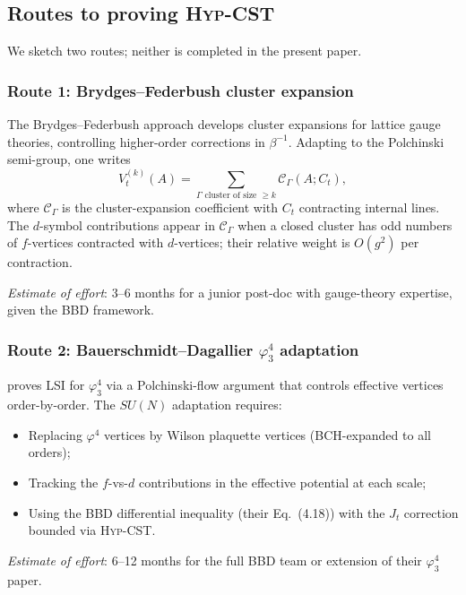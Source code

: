 \documentclass[11pt,a4paper]{amsart}
\theoremstyle{definition}
\begin{document}
\subsection{Routes to proving \textsc{Hyp-CST}}\label{ssec:CST-routes}

We sketch two routes; neither is completed in the present paper.

\subsubsection{Route 1: Brydges--Federbush cluster expansion}

The Brydges--Federbush approach \cite{BrydgesFederbush1981, Brydges2009}
develops cluster expansions for lattice gauge theories, controlling
higher-order corrections in $\beta^{-1}$. Adapting to the Polchinski
semi-group, one writes
\[
V_t^{(k)}(A) = \sum_{\Gamma \text{ cluster of size } \geq k} \mathcal C_\Gamma(A; C_t),
\]
where $\mathcal C_\Gamma$ is the cluster-expansion coefficient with $C_t$
contracting internal lines. The $d$-symbol contributions appear in
$\mathcal C_\Gamma$ when a closed cluster has odd numbers of $f$-vertices
contracted with $d$-vertices; their relative weight is $O(g^2)$ per
contraction.

\emph{Estimate of effort}: 3--6 months for a junior post-doc with
gauge-theory expertise, given the BBD framework.

\subsubsection{Route 2: Bauerschmidt--Dagallier $\varphi^4_3$ adaptation}

\cite{BauerschmidtDagallier2024} proves LSI for $\varphi^4_3$ via a
Polchinski-flow argument that controls effective vertices order-by-order.
The $SU(N)$ adaptation requires:
\begin{itemize}[leftmargin=2em]
\item Replacing $\varphi^4$ vertices by Wilson plaquette vertices
(BCH-expanded to all orders);
\item Tracking the $f$-vs-$d$ contributions in the effective potential
at each scale;
\item Using the BBD differential inequality (their Eq.~(4.18)) with
the $J_t$ correction bounded via \textsc{Hyp-CST}.
\end{itemize}

\emph{Estimate of effort}: 6--12 months for the full BBD team or extension
of their $\varphi^4_3$ paper.
\end{document}
